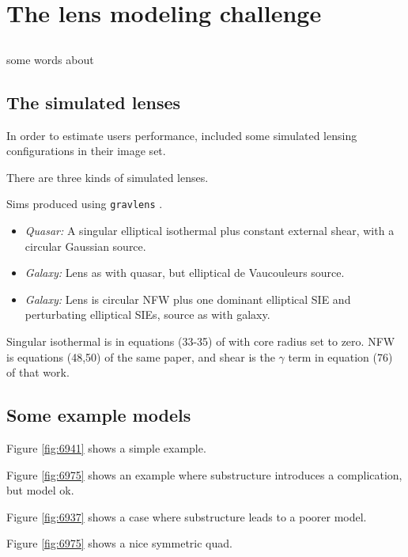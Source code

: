 \section{The lens modeling challenge} \label{sec:results}

\subsection{\sw} \label{sec:SpaceWarps}
some words about \sw

\subsection{The simulated lenses} \label{sec:sims}

In order to estimate users performance, \sw included some simulated lensing configurations in their image set.

There are three kinds of simulated lenses.

Sims produced using {\tt gravlens}
\citep{2001astro.ph..2341K,2001astro.ph..2340K}.

\begin{itemize}
  \item {\em Quasar:\/} A singular elliptical isothermal plus constant
    external shear, with a circular Gaussian source.
  \item {\em Galaxy:\/} Lens as with quasar, but elliptical de
    Vaucouleurs source.
  \item {\em Galaxy:\/} Lens is circular NFW plus one dominant
    elliptical SIE and perturbating elliptical SIEs, source as with
    galaxy.
\end{itemize}

Singular isothermal is in equations (33-35) of
\cite{2001astro.ph..2341K} with core radius set to zero. NFW is
equations (48,50) of the same paper, and shear is the $\gamma$ term in
equation (76) of that work.

\subsection{Some example models}

Figure \ref{fig:6941} shows a simple example.

Figure \ref{fig:6975} shows an example where substructure introduces a
complication, but model ok.

Figure \ref{fig:6937} shows a case where substructure leads to a
poorer model.

Figure \ref{fig:6975} shows a nice symmetric quad.

